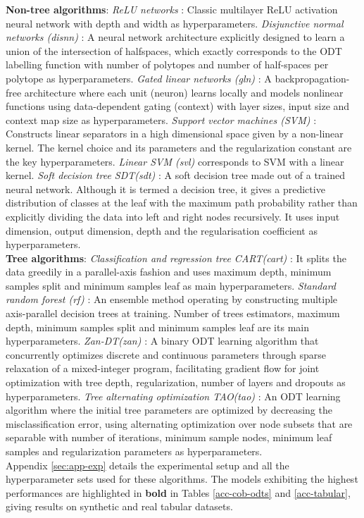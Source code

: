 \documentclass{article} %
\renewcommand{\>}{{\rightarrow}}
\renewcommand{\=}{\stackrel{\triangle}{=}}
\newcommand{\0}{{\mathbf 0}}
\begin{document}
\textbf{Non-tree algorithms}:
\textit{ReLU networks} \citep{fukushima1969visual}: Classic multilayer ReLU activation neural network with depth and width as hyperparameters.
\textit{Disjunctive normal networks (disnn)} \citep{sajjadi2016disjunctive}: A neural network architecture explicitly designed to learn a union of the intersection of halfspaces, which exactly corresponds to the ODT labelling function with number of polytopes and number of half-spaces per polytope as hyperparameters.
\textit{Gated linear networks (gln)}  \citep{veness2021gated}: A backpropagation-free architecture where each unit (neuron) learns locally and models nonlinear functions using data-dependent gating (context) with layer sizes, input size and context map size as hyperparameters.
\textit{Support vector machines (SVM)} \citep{cortes1995support}: Constructs linear separators in a high dimensional space given by a non-linear kernel. The kernel choice and its parameters and the regularization constant are the key hyperparameters. \textit{Linear SVM (svl)} corresponds to SVM with a linear kernel.
\textit{Soft decision tree SDT(sdt)} \citep{FrosstHinton17}: A soft decision tree made out of a trained neural network. Although it is termed a decision tree, it gives a predictive distribution of classes at the leaf with the maximum path probability rather than explicitly dividing the data into left and right nodes recursively. It uses input dimension, output dimension, depth and the regularisation coefficient as hyperparameters.\\

\textbf{Tree algorithms}:
\textit{Classification and regression tree CART(cart)} \citep{breiman1984classification}: It splits the data greedily in a parallel-axis fashion and uses maximum depth, minimum samples split and minimum samples leaf as main hyperparameters.
\textit{Standard random forest (rf)} \citep{ho1995random}: An ensemble method operating by constructing multiple axis-parallel decision trees at training. Number of trees estimators, maximum depth, minimum samples split and minimum samples leaf are its main hyperparameters.
\textit{Zan-DT(zan)} \citep{Zantedeschi2020LearningBD}: A binary ODT learning algorithm that concurrently optimizes discrete and continuous parameters through sparse relaxation of a mixed-integer program, facilitating gradient flow for joint optimization with tree depth, regularization, number of layers and dropouts as hyperparameters.
\textit{Tree alternating optimization TAO(tao)} \citep{carreira2018alternating}: An ODT learning algorithm where the initial tree parameters are optimized by decreasing the misclassification error, using alternating optimization over node subsets that are separable with number of iterations, minimum sample nodes, minimum leaf samples and regularization parameters as hyperparameters.\\
Appendix \ref{sec:app-exp} details the experimental setup and all the hyperparameter sets used for these algorithms. The models exhibiting the highest performances are highlighted in \textbf{bold} in Tables \ref{acc-cob-odts} and \ref{acc-tabular}, giving results on synthetic and real tabular datasets.
\end{document}
